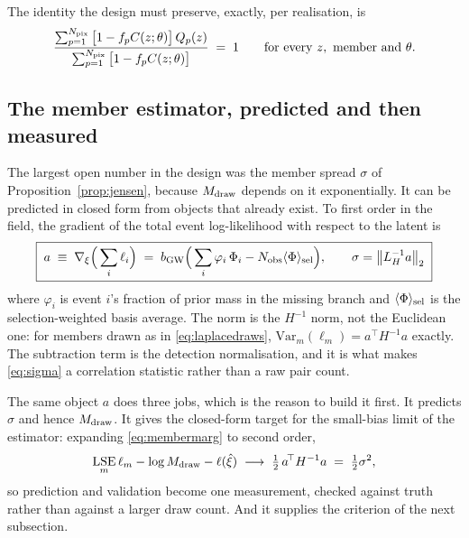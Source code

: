 \documentclass[11pt]{article}
\theoremstyle{definition}
\theoremstyle{remark}
\newcommand{\bgw}{b_{\rm GW}}
\newcommand{\Mdraw}{M_{\rm draw}}
\newcommand{\LSE}{\mathop{\mathrm{LSE}}}
\newcommand{\Var}{\mathrm{Var}}
\newcommand{\Npix}{N_{\rm pix}}
\begin{document}
The identity the design must preserve, exactly, per realisation, is
\begin{equation}
  \frac{\sum_{p=1}^{\Npix}\big[1-f_pC(z;\theta)\big]\,Q_p(z)}
       {\sum_{p=1}^{\Npix}\big[1-f_pC(z;\theta)\big]}\;=\;1
  \qquad\text{for every }z,\text{ member and }\theta .
  \label{eq:budget}
\end{equation}

\subsection{The member estimator, predicted and then measured}
\label{sec:est}

The largest open number in the design was the member spread $\sigma$ of
Proposition~\ref{prop:jensen}, because $\Mdraw$ depends on it exponentially. It can
be predicted in closed form from objects that already exist. To first order in the
field, the gradient of the total event log-likelihood with respect to the latent is
\begin{equation}
  \boxed{\;a\;\equiv\;\nabla_\xi\Big(\sum_i\ell_i\Big)
   \;=\;\bgw\Big(\sum_i\varphi_i\,\Phi_i-N_{\rm obs}\langle\Phi\rangle_{\rm sel}\Big),
   \qquad
   \sigma=\big\|L_H^{-1}a\big\|_2 \;}
  \label{eq:sigma}
\end{equation}
where $\varphi_i$ is event $i$'s fraction of prior mass in the missing branch and
$\langle\Phi\rangle_{\rm sel}$ is the selection-weighted basis average. The norm is
the $H^{-1}$ norm, not the Euclidean one: for members drawn as in
\eqref{eq:laplacedraws}, $\Var_m(\ell_m)=a^{\!\top}H^{-1}a$ exactly. The subtraction
term is the detection normalisation, and it is what makes \eqref{eq:sigma} a
correlation statistic rather than a raw pair count.

The same object $a$ does three jobs, which is the reason to build it first. It
predicts $\sigma$ and hence $\Mdraw$. It gives the closed-form target for the
small-bias limit of the estimator: expanding \eqref{eq:membermarg} to second order,
\begin{equation}
  \LSE_m\ell_m-\log\Mdraw-\ell(\hat\xi)\;\longrightarrow\;\tfrac12\,a^{\!\top}H^{-1}a
  \;=\;\tfrac12\sigma^2 ,
  \label{eq:P17}
\end{equation}
so prediction and validation become one measurement, checked against truth rather
than against a larger draw count. And it supplies the criterion of the next
subsection.
\end{document}
